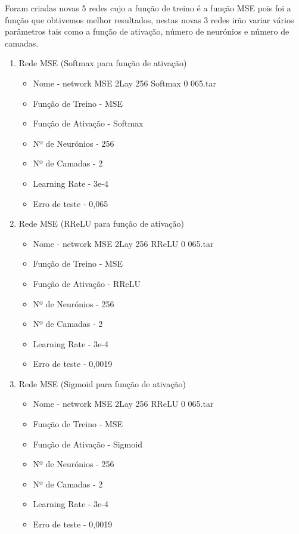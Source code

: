 \documentclass[10pt]{article}
\begin{document}
Foram criadas novas 5 redes cujo a função de treino é a função MSE pois foi
a função que obtivemos melhor resultados, nestas novas 3 redes irão variar vários parâmetros
tais como a função de ativação, número de neurónios e número de camadas.

\vspace{1cm}
\begin{enumerate}
  \item Rede MSE (Softmax para função de ativação)
  \begin{itemize}
    \item Nome - network MSE 2Lay 256 Softmax 0 065.tar
    \item Função de Treino - MSE
    \item Função de Ativação - Softmax
    \item Nº de Neurónios - 256
    \item Nº de Camadas - 2
    \item Learning Rate - 3e-4
    \item Erro de teste - 0,065
  \end{itemize}
  \newpage
  \item Rede MSE (RReLU para função de ativação)
  \begin{itemize}
    \item Nome - network MSE 2Lay 256 RReLU 0 065.tar
    \item Função de Treino - MSE
    \item Função de Ativação - RReLU
    \item Nº de Neurónios - 256
    \item Nº de Camadas - 2
    \item Learning Rate - 3e-4
    \item Erro de teste - 0,0019
  \end{itemize}
  \vspace{1cm}
  \item Rede MSE (Sigmoid para função de ativação)
  \begin{itemize}
    \item Nome - network MSE 2Lay 256 RReLU 0 065.tar
    \item Função de Treino - MSE
    \item Função de Ativação - Sigmoid
    \item Nº de Neurónios - 256
    \item Nº de Camadas - 2
    \item Learning Rate - 3e-4
    \item Erro de teste - 0,0019

\end{itemize}
\end{enumerate}
\end{document}
